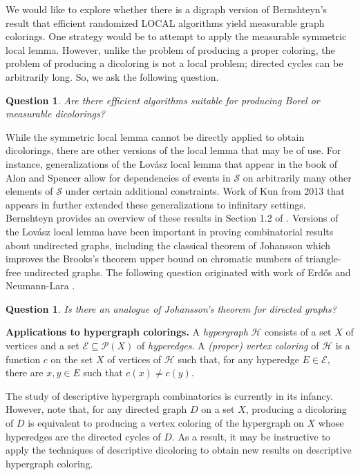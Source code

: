\documentclass[psamsfonts]{amsart}
\newtheorem{quest}[thm]{Question}
\theoremstyle{definition}
\theoremstyle{remark}
\numberwithin{equation}{section}
\begin{document}
We would like to explore whether there is a digraph version of Bernshteyn's result that efficient randomized \textsf{LOCAL} algorithms yield measurable graph colorings. One strategy would be to attempt to apply the measurable symmetric local lemma. However, unlike the problem of producing a proper coloring, the problem of producing a dicoloring is not a local problem; directed cycles can be arbitrarily long. So, we ask the following question.

\begin{quest}
    Are there efficient algorithms suitable for producing Borel or measurable dicolorings?
\end{quest}

While the symmetric local lemma cannot be directly applied to obtain dicolorings, there are other versions of the local lemma that may be of use. For instance, generalizations of the Lovász local lemma that appear in the book of Alon and Spencer \cite{as2008} allow for dependencies of events in $\mathcal{S}$ on arbitrarily many other elements of $\mathcal{S}$ under certain additional constraints. Work of Kun from 2013 that appears in \cite{bfk2022} further extended these generalizations to infinitary settings. Bernshteyn provides an overview of these results in Section 1.2 of \cite{bernshteyn2019}. Versions of the Lovász local lemma have been important in proving combinatorial results about undirected graphs, including the classical theorem of Johansson \cite{johansson1996} which improves the Brooks's theorem upper bound on chromatic numbers of triangle-free undirected graphs. The following question originated with work of Erd\H{o}s and Neumann-Lara \cite{erdos1979}.

\begin{quest}
\label{quest:johansson}
    Is there an analogue of Johansson's theorem for directed graphs?
\end{quest}

{\bf Applications to hypergraph colorings.} A {\it hypergraph} $\mathcal{H}$ consists of a set $X$ of vertices and a set $\mathcal{E} \subseteq \mathcal{P}(X)$ of {\it hyperedges}. A {\it (proper) vertex coloring} of $\mathcal{H}$ is a function $c$ on the set $X$ of vertices of $\mathcal{H}$ such that, for any hyperedge $E \in \mathcal{E}$, there are $x, y \in E$ such that $c(x) \neq c(y)$. 

The study of descriptive hypergraph combinatorics is currently in its infancy. However, note that, for any directed graph $D$ on a set $X$, producing a dicoloring of $D$ is equivalent to producing a vertex coloring of the hypergraph on $X$ whose hyperedges are the directed cycles of $D$. As a result, it may be instructive to apply the techniques of descriptive dicoloring to obtain new results on descriptive hypergraph coloring.
\end{document}
